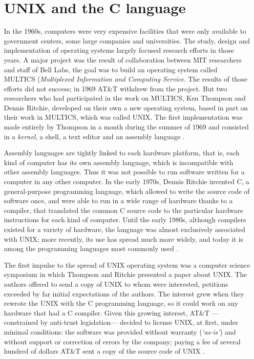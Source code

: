 \section{UNIX and the C language}

In the 1960s, computers were very expensive facilities that were only available to government centers, some large companies and universities. The study, design and implementation of operating systems largely focused research efforts in those years. A major project was the result of collaboration between MIT researchers and staff of Bell Labs, the goal was to build an operating system called MULTICS (\emph{Multiplexed Information and Computing Service}. The results of those efforts did not success; in 1969 AT\&T withdrew from the project. But two researchers who had participated in the work on MULTICS, Ken Thompson and Dennis Ritchie, developed on their own a new operating system, based in part on their work in MULTICS, which was called UNIX. The first implementation was made entirely by Thompson in a month during the summer of 1969 and consisted in a \emph{kernel}, a shell, a text editor and an assembly language \citep[26]{weber:2004}.

Assembly languages are tightly linked to each hardware platform, that is, each kind of computer has its own assembly language, which is incompatible with other assembly languages. Thus it was not possible to run software written for a computer in any other computer. In the early 1970s, Dennis Ritchie invented C, a general-purpose programming language, which allowed to write the source code of software once, and were able to run in a wide range of hardware thanks to a compiler, that translated the common C source code to the particular hardware instructions for each kind of computer. Until the early 1980s, although compilers existed for a variety of hardware, the language was almost exclusively associated with UNIX; more recently, its use has spread much more widely, and today it is among the programming languages most commonly used \citep{ritchie:1993}.

The first impulse to the spread of UNIX operating system was a computer science symposium in which Thompson and Ritchie presented a paper about UNIX. The authors offered to send a copy of UNIX to whom were interested, petitions exceeded by far initial expectations of the authors. The interest grew when they rewrote the UNIX with the C programming language, so it could work on any hardware that had a C compiler. Given this growing interest, AT\&T ---constrained by anti-trust legislation--- decided to license UNIX, at first, under minimal conditions: the software was provided without warranty (\emph{`as-is'}) and without support or correction of errors by the company; paying a fee of several hundred of dollars AT\&T sent a copy of the source code of UNIX \citep[28-29]{weber:2004}.

